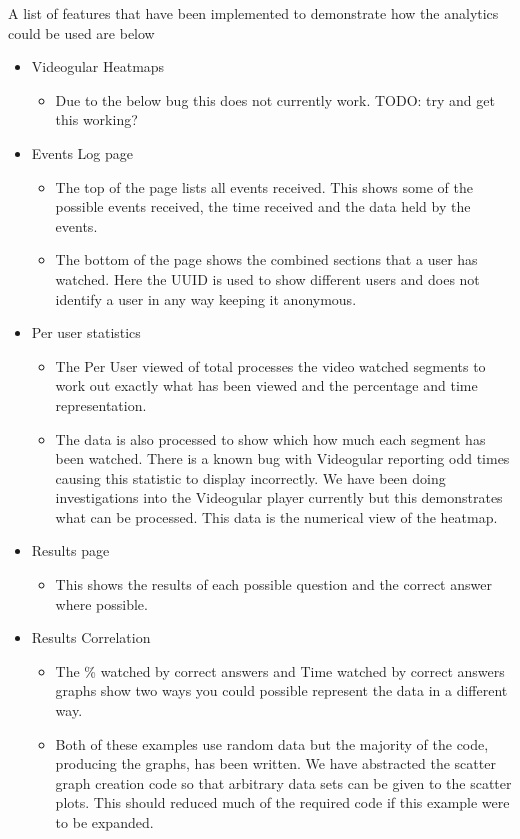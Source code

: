 \documentclass[12pt,a4paper]{article}
\begin{document}
A list of features that have been implemented to demonstrate how the analytics could be used are below

\begin{itemize}
\item Videogular Heatmaps
	\begin{itemize}
	\item Due to the below bug this does not currently work. TODO: try and get this working?
	\end{itemize}

\item Events Log page
	\begin{itemize}
	\item The top of the page lists all events received. This shows some of the possible events received, the time received and the data held by the events.
	\item The bottom of the page shows the combined sections that a user has watched. Here the UUID is used to show different users and does not identify a user in any way keeping it anonymous.
	\end{itemize}
	
\item Per user statistics
	\begin{itemize}
	\item The Per User viewed of total processes the video watched segments to work out exactly what has been viewed and the percentage and time representation.
	\item The data is also processed to show which how much each segment has been watched. There is a known bug with Videogular reporting odd times causing this statistic to display incorrectly. We have been doing investigations into the Videogular player currently but this demonstrates what can be processed. This data is the numerical view of the heatmap.
	\end{itemize}

\item Results page
	\begin{itemize}
	\item This shows the results of each possible question and the correct answer where possible.
	\end{itemize}

\item Results Correlation
	\begin{itemize}
	\item The \% watched by correct answers and Time watched by correct answers graphs show two ways you could possible represent the data in a different way.
	\item Both of these examples use random data but the majority of the code, producing the graphs, has been written. We have abstracted the scatter graph creation code so that arbitrary data sets can be given to the scatter plots. This should reduced much of the required code if this example were to be expanded.
	\end{itemize}

\end{itemize}
\end{document}
